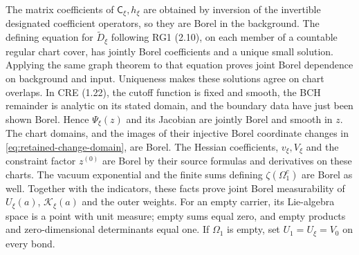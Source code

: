 \documentclass[11pt]{article}
\begin{document}
The matrix coefficients of $\mathsf C_\xi,h_\xi$ are obtained by inversion of the invertible designated coefficient operators, so they are Borel in the background. The defining equation for $\widetilde D_\xi$ following RG1 (2.10), on each member of a countable regular chart cover, has jointly Borel coefficients and a unique small solution. Applying the same graph theorem to that equation proves joint Borel dependence on background and input. Uniqueness makes these solutions agree on chart overlaps. In CRE (1.22), the cutoff function is fixed and smooth, the BCH remainder is analytic on its stated domain, and the boundary data have just been shown Borel. Hence $\Psi_\xi(z)$ and its Jacobian are jointly Borel and smooth in $z$. The chart domains, and the images of their injective Borel coordinate changes in \eqref{eq:retained-change-domain}, are Borel. The Hessian coefficients, $v_\xi,V_\xi$ and the constraint factor $z^{(0)}$ are Borel by their source formulas and derivatives on these charts. The vacuum exponential and the finite sums defining $\zeta(\Omega_1^c)$ are Borel as well. Together with the indicators, these facts prove joint Borel measurability of $U_\xi(a)$, $\mathcal K_\xi(a)$ and the outer weights. For an empty carrier, its Lie-algebra space is a point with unit measure; empty sums equal zero, and empty products and zero-dimensional determinants equal one. If $\Omega_1$ is empty, set $U_1=U_\xi=V_0$ on every bond.
\end{document}

